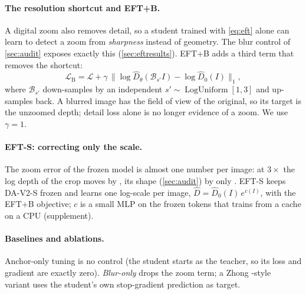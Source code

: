 \paragraph{The resolution shortcut and EFT+B.}
A digital zoom also removes detail, so a student trained with \cref{eq:eft} alone can learn to detect a
zoom from \emph{sharpness} instead of geometry. The blur control of \cref{sec:audit} exposes exactly this (\cref{sec:eftresults}).
EFT+B adds a third term that removes the shortcut:
\begin{equation}
  \mathcal{L}_{\text{B}} = \mathcal{L} + \gamma\,\big\| \log \hat D_\theta(\mathcal{B}_{s'} I) - \log \hat D_0(I)\big\|_1,
\end{equation}
where $\mathcal{B}_{s'}$ down-samples by an independent $s'\sim\operatorname{LogUniform}[1,3]$ and
up-samples back. A blurred image has the field of view of the original, so its target is the
unzoomed depth; detail loss alone is no longer evidence of a zoom. We use $\gamma=1$.

\paragraph{EFT-S: correcting only the scale.}
The zoom error of the frozen model is almost one number per image: at $3\times$ the log depth of the crop
moves by \fixedShiftThree, its shape (\cref{sec:audit}) by only \fixedShapeThree. EFT-S keeps DA-V2-S frozen and
learns one log-scale per image, $\hat D = \hat D_0(I)\,e^{c(I)}$, with the EFT+B objective; $c$ is a small MLP on
the frozen tokens that trains from a cache on a CPU (supplement).

\paragraph{Baselines and ablations.} Anchor-only tuning is no control (the student starts as the teacher, so
its loss and gradient are exactly zero). \emph{Blur-only} drops the zoom term; a Zhong \etal-style~\cite{zhong2023equivariance}
variant uses the student's own stop-gradient prediction as target.
